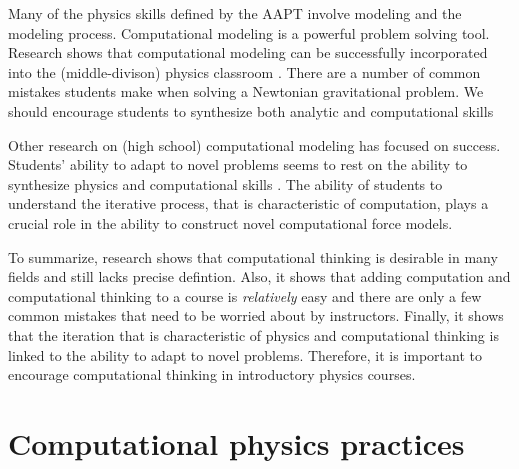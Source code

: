 \documentclass{msuphddissertation}
\begin{document}
\begin{doublespace}
Many of the physics skills defined by the AAPT involve modeling and the modeling process.  Computational modeling is a powerful problem solving tool.  Research shows that computational modeling can be successfully incorporated into the (middle-divison) physics classroom \cite{Caballero2011}.  There are a number of common mistakes students make when solving a Newtonian gravitational problem.  We should encourage students to synthesize both analytic and computational skills \cite{Caballero2014,MORE}

Other research on (high school) computational modeling has focused on success.  Students' ability to adapt to novel problems seems to rest on the ability to synthesize physics and computational skills \cite{Aiken2012}.  The ability of students to understand the iterative process, that is characteristic of computation, plays a crucial role in the ability to construct novel computational force models.

To summarize, research shows that computational thinking is desirable in many fields and still lacks precise defintion.  Also, it shows that adding computation and computational thinking to a course is \textit{relatively} easy and there are only a few common mistakes that need to be worried about by instructors.  Finally, it shows that the iteration that is characteristic of physics and computational thinking is linked to the ability to adapt to novel problems.  Therefore, it is important to encourage computational thinking in introductory physics courses.

\section{Computational physics practices}



\end{doublespace}
\end{document}
